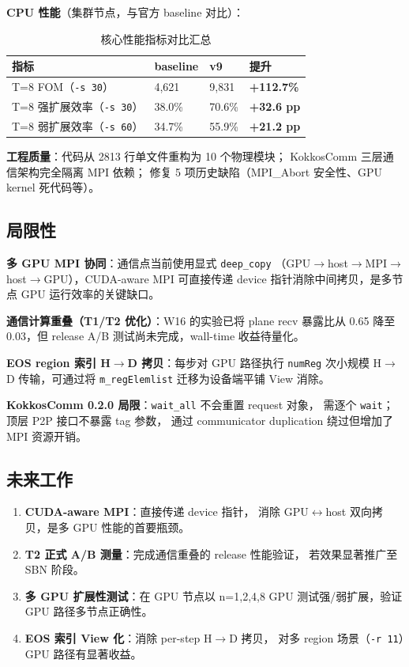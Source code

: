 \documentclass[UTF8,12pt,a4paper]{ctexart}
\begin{document}
\textbf{CPU 性能}（集群节点，与官方 baseline 对比）：

\begin{table}[H]
\centering
\caption{核心性能指标对比汇总}
\label{tab:summary}
\begin{tabular}{llll}
\toprule
\textbf{指标} & \textbf{baseline} & \textbf{v9} & \textbf{提升} \\
\midrule
T=8 FOM（\texttt{-s 30}）          & 4,621   & 9,831  & \textbf{+112.7\%} \\
T=8 强扩展效率（\texttt{-s 30}）   & 38.0\%  & 70.6\% & \textbf{+32.6 pp} \\
T=8 弱扩展效率（\texttt{-s 60}）   & 34.7\%  & 55.9\% & \textbf{+21.2 pp} \\
\bottomrule
\end{tabular}
\end{table}

\textbf{工程质量}：代码从 2813 行单文件重构为 10 个物理模块；
KokkosComm 三层通信架构完全隔离 MPI 依赖；
修复 5 项历史缺陷（MPI\_Abort 安全性、GPU kernel 死代码等）。

\subsection{局限性}

\textbf{多 GPU MPI 协同}：通信点当前使用显式 \texttt{deep\_copy}
（GPU$\to$host$\to$MPI$\to$host$\to$GPU），CUDA-aware MPI
可直接传递 device 指针消除中间拷贝，是多节点 GPU 运行效率的关键缺口。

\textbf{通信计算重叠（T1/T2 优化）}：W16 的实验已将 plane recv 暴露比从 0.65 降至
0.03，但 release A/B 测试尚未完成，wall-time 收益待量化。

\textbf{EOS region 索引 H$\to$D 拷贝}：每步对 GPU 路径执行 \texttt{numReg}
次小规模 H$\to$D 传输，可通过将 \texttt{m\_regElemlist}
迁移为设备端平铺 View 消除。

\textbf{KokkosComm 0.2.0 局限}：\texttt{wait\_all} 不会重置 request 对象，
需逐个 \texttt{wait}；顶层 P2P 接口不暴露 tag 参数，
通过 communicator duplication 绕过但增加了 MPI 资源开销。

\subsection{未来工作}

\begin{enumerate}[noitemsep,topsep=2pt]
  \item \textbf{CUDA-aware MPI}：直接传递 device 指针，
        消除 GPU$\leftrightarrow$host 双向拷贝，是多 GPU 性能的首要瓶颈。
  \item \textbf{T2 正式 A/B 测量}：完成通信重叠的 release 性能验证，
        若效果显著推广至 SBN 阶段。
  \item \textbf{多 GPU 扩展性测试}：在 GPU 节点以 n=1,2,4,8 GPU
        测试强/弱扩展，验证 GPU 路径多节点正确性。
  \item \textbf{EOS 索引 View 化}：消除 per-step H$\to$D 拷贝，
        对多 region 场景（\texttt{-r 11}）GPU 路径有显著收益。
\end{enumerate}
\end{document}
